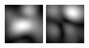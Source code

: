 \begin{figure}[ht]
\begin{center}
 \includegraphics[width=\columnwidth/9]{ch4/figures/mag_3_1.jpg}
 \includegraphics[width=\columnwidth/9]{ch4/figures/mag_3_2.jpg}

\end{center}
\end{figure}
